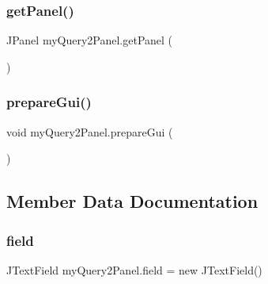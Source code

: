 \hypertarget{classmy_query2_panel_a7977bb42f9d5959684f805e08337d27b}{}\label{classmy_query2_panel_a7977bb42f9d5959684f805e08337d27b} 
\subsubsection{\texorpdfstring{get\+Panel()}{getPanel()}}
{\footnotesize\ttfamily J\+Panel my\+Query2\+Panel.\+get\+Panel (\begin{DoxyParamCaption}{ }\end{DoxyParamCaption})}

\hypertarget{classmy_query2_panel_a734aedb77732969bf2c9834104a0d59e}{}\label{classmy_query2_panel_a734aedb77732969bf2c9834104a0d59e} 
\subsubsection{\texorpdfstring{prepare\+Gui()}{prepareGui()}}
{\footnotesize\ttfamily void my\+Query2\+Panel.\+prepare\+Gui (\begin{DoxyParamCaption}{ }\end{DoxyParamCaption})}



\subsection{Member Data Documentation}
\hypertarget{classmy_query2_panel_a0e8b5a13ce5b78ea87609934978e9190}{}\label{classmy_query2_panel_a0e8b5a13ce5b78ea87609934978e9190} 
\subsubsection{\texorpdfstring{field}{field}}
{\footnotesize\ttfamily J\+Text\+Field my\+Query2\+Panel.\+field = new J\+Text\+Field()\hspace{0.3cm}{\ttfamily [private]}}

\hypertarget{classmy_query2_panel_aa8e92271cbba0fcab6c9947a0c27a86d}{}\label{classmy_query2_panel_aa8e92271cbba0fcab6c9947a0c27a86d} 
